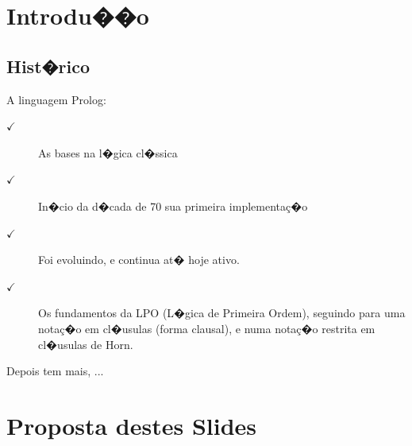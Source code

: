 \documentclass[final,a4paper]{article}
\begin{document}
\tableofcontents

\section{Introdu��o}

\subsection{Hist�rico}

A linguagem Prolog:
\begin{description}

\item[$\checkmark $] As bases na l�gica cl�ssica
\item[$\checkmark $] In�cio da d�cada de 70 sua primeira implementa\c{c}�o
\item[$\checkmark $] Foi evoluindo, e continua at� hoje ativo.
\item[$\checkmark $] Os fundamentos da LPO (L�gica de Primeira Ordem),
seguindo para uma nota\c{c}�o em cl�usulas (forma clausal), e numa
nota\c{c}�o restrita em cl�usulas de Horn.
\end{description}

Depois tem mais, ...


\section{Proposta destes Slides}
\end{document}
